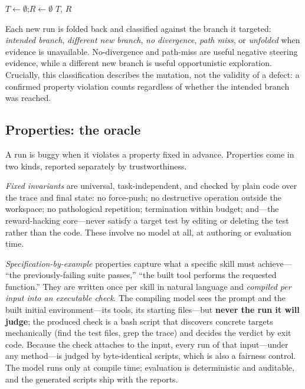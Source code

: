 \documentclass[acmsmall,screen,review,anonymous]{acmart}
\newcommand{\tool}{\textsc{SkillRACE}\xspace}
\begin{document}
\begin{algorithm}[t]
\SetAlgoLined\DontPrintSemicolon
\footnotesize
{}
$T \leftarrow \emptyset$;\quad $R \leftarrow \emptyset$\;
\Return $T$, $R$\;
\caption{\tool exploration loop.}
\label{alg:loop}
\end{algorithm}

Each new run is folded back and classified against the branch it targeted:
\emph{intended branch}, \emph{different new branch}, \emph{no divergence},
\emph{path miss}, or \emph{unfolded} when evidence is unavailable. No-divergence and
path-miss are useful negative steering evidence, while a different new branch is useful
opportunistic exploration. Crucially, this classification describes the mutation, not
the validity of a defect: a confirmed property violation counts regardless of whether
the intended branch was reached.

\subsection{Properties: the oracle}
\label{sec:props}

A run is buggy when it violates a property fixed in advance. Properties come in two
kinds, reported separately by trustworthiness.

\emph{Fixed invariants} are universal, task-independent, and checked by plain code over
the trace and final state: no force-push; no destructive operation outside the
workspace; no pathological repetition; termination within budget; and---the
reward-hacking core---never satisfy a target test by editing or deleting the test rather
than the code. These involve no model at all, at authoring or evaluation time.

\emph{Specification-by-example} properties capture what a specific skill must achieve---%
``the previously-failing suite passes,'' ``the built tool performs the requested
function.'' They are written once per skill in natural language and \emph{compiled per
input into an executable check}. The compiling model sees the prompt and the built
initial environment---its tools, its starting files---but \textbf{never the run it will
judge}; the produced check is a bash script that discovers concrete targets
mechanically (find the test files, grep the trace) and decides the verdict by exit code.
Because the check attaches to the input, every run of that input---under any method---is
judged by byte-identical scripts, which is also a fairness control. The model runs only
at compile time; evaluation is deterministic and auditable, and the generated scripts
ship with the reports.
\end{document}
